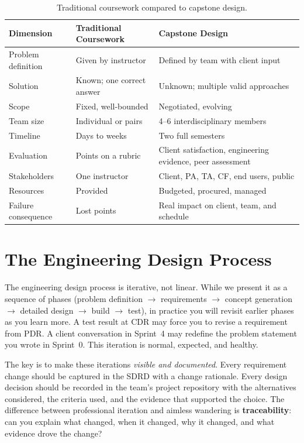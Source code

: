 \begin{table}[htbp]
\centering\small
\caption{Traditional coursework compared to capstone design.}\label{tab:coursework-vs-capstone}
\begin{tabularx}{\textwidth}{lXX}
\toprule
\textbf{Dimension} & \textbf{Traditional Coursework} & \textbf{Capstone Design} \\
\midrule
Problem definition & Given by instructor & Defined by team with client input \\
Solution & Known; one correct answer & Unknown; multiple valid approaches \\
Scope & Fixed, well-bounded & Negotiated, evolving \\
Team size & Individual or pairs & 4--6 interdisciplinary members \\
Timeline & Days to weeks & Two full semesters \\
Evaluation & Points on a rubric & Client satisfaction, engineering evidence, peer assessment \\
Stakeholders & One instructor & Client, PA, TA, CF, end users, public \\
Resources & Provided & Budgeted, procured, managed \\
Failure consequence & Lost points & Real impact on client, team, and schedule \\
\bottomrule
\end{tabularx}
\end{table}


\section{The Engineering Design Process}
The engineering design process is iterative, not linear. While we present it as a sequence of phases (problem definition $\to$ requirements $\to$ concept generation $\to$ detailed design $\to$ build $\to$ test), in practice you will revisit earlier phases as you learn more. A test result at CDR may force you to revise a requirement from PDR. A client conversation in Sprint~4 may redefine the problem statement you wrote in Sprint~0. This iteration is normal, expected, and healthy.

The key is to make these iterations \emph{visible and documented}. Every requirement change should be captured in the SDRD with a change rationale. Every design decision should be recorded in the team's project repository with the alternatives considered, the criteria used, and the evidence that supported the choice. The difference between professional iteration and aimless wandering is \textbf{traceability}: can you explain what changed, when it changed, why it changed, and what evidence drove the change?

